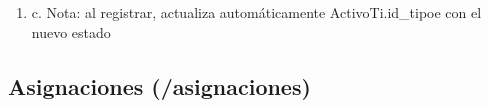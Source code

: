 \begin{enumerate}
\begin{enumerate}
\begin{enumerate}
                    \begin{enumerate}
                        \item 1. Number (entero)
                        \item 2. No requerido - Default null
                        \item 3. Debe existir en Usuario del Sistema
                    \end{enumerate}
            \end{enumerate}
        \item c. Nota: al registrar, actualiza automáticamente ActivoTi.id\_tipoe con el nuevo estado
    \end{enumerate}
\end{enumerate}

\subsection{Asignaciones (/asignaciones)}

